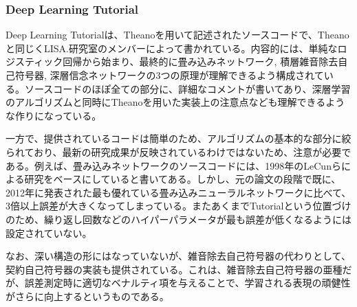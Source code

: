 \subsubsection{Deep Learning Tutorial}
Deep Learning Tutorialは、Theanoを用いて記述されたソースコードで、Theanoと同じくLISA.研究室のメンバーによって書かれている。内容的には、単純なロジスティック回帰から始まり、最終的に畳み込みネットワーク, 積層雑音除去自己符号器, 深層信念ネットワークの3つの原理が理解できるよう構成されている。ソースコードのほぽ全ての部分に、詳細なコメントが書いてあり、深層学習のアルゴリズムと同時にTheanoを用いた実装上の注意点なども理解できるような作りになっている。\par
一方で、提供されているコードは簡単のため、アルゴリズムの基本的な部分に絞られており、最新の研究成果が反映されているわけではないため、注意が必要である。例えば、畳み込みネットワークのソースコードには、1998年のLeCunらによる研究\cite{lecun1998gradient-based}をベースにしていると書いてある。しかし、元の論文の段階で既に、2012年に発表された最も優れている畳み込みニューラルネットワーク\cite{ciresan2012multi-column}に比べて、3倍以上誤差が大きくなってしまっている。またあくまでTutorialという位置づけのため、繰り返し回数などのハイパーパラメータが最も誤差が低くなるようには設定されていない。\par
なお、深い構造の形にはなっていないが、雑音除去自己符号器の代わりとして、契約自己符号器\cite{rifai2011contractive}\cite{rifai2011learning}の実装も提供されている。これは、雑音除去自己符号器の亜種だが、誤差測定時に適切なベナルティ項を与えることで、学習される表現の頑健性がさらに向上するというものである。

